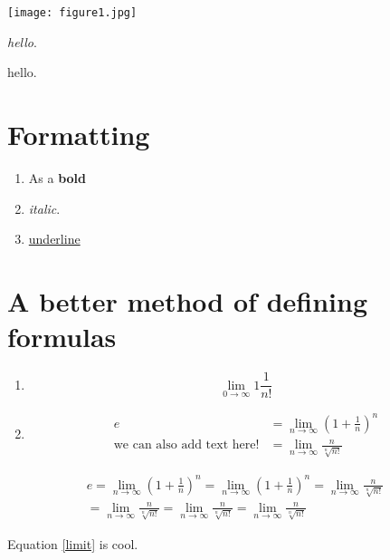 \documentclass{article}
\numberwithin{table}{section}
\numberwithin{equation}{section}
\numberwithin{figure}{section}
\numberwithin{theorem}{section}
\begin{document}
\vskip 3cm

\texttt{[image: figure1.jpg]}

\textit{hello}.

hello.


\section{Formatting}

\begin{enumerate}
    \item As a \textbf{bold}
    \item \textit{italic}.
    \item \underline{underline}

\end{enumerate}

\section{A better method of defining formulas}

\begin{enumerate}
    \item \begin{equation}
    \label{limit}
        \lim_{0\to\infty}{1}\frac{1}{n!}
    \end{equation}
    
    \item 
    \begin{equation}
    \begin{split}
        \label{limit e}
        e &= \lim_{n\to\infty} \left(1+\frac{1}{n}\right)^n \\
        \text{we can also add text here!}&=\lim_{n\to\infty} \frac{n}{\sqrt[n]{n!}}
    \end{split}
    \end{equation}

\end{enumerate}


\begin{multline}
    \label{multline}
        e = \lim_{n\to\infty} \left(1+\frac{1}{n}\right)^n = \lim_{n\to\infty} \left(1+\frac{1}{n}\right)^n=\lim_{n\to\infty} \frac{n}{\sqrt[n]{n!}} \\
        =\lim_{n\to\infty} \frac{n}{\sqrt[n]{n!}}=\lim_{n\to\infty} \frac{n}{\sqrt[n]{n!}}=\lim_{n\to\infty} \frac{n}{\sqrt[n]{n!}}
\end{multline}

Equation \ref{limit} is cool.
\end{document}
